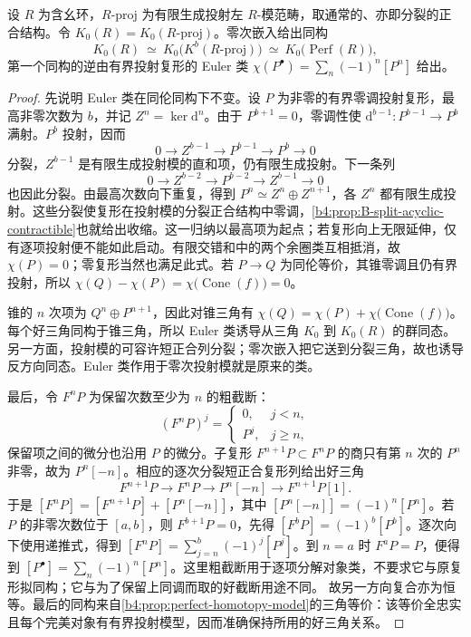 \begin{theorem}\label{b4:thm:B-euler-isomorphism}
	设 \(R\) 为含幺环，\(R\text{-}\mathrm{proj}\) 为有限生成投射左 \(R\)-模范畴，取通常的、亦即分裂的正合结构。令 \(K_0(R)=K_0(R\text{-}\mathrm{proj})\)。零次嵌入给出同构
	\[
		K_0(R)\ \simeq\ K_0\bigl(K^b(R\text{-}\mathrm{proj})\bigr) \ \simeq\ K_0\bigl(\operatorname{Perf}(R)\bigr),
	\]
	第一个同构的逆由有界投射复形的 Euler 类 \(\chi(P^\bullet)=\sum_n(-1)^n[P^n]\) 给出。
\end{theorem}
\begin{proof}
	先说明 Euler 类在同伦同构下不变。设 \(P\) 为非零的有界零调投射复形，最高非零次数为 \(b\)，并记 \(Z^n=\ker\mathrm{d}^n\)。由于 \(P^{b+1}=0\)，零调性使 \(\mathrm{d}^{b-1}:P^{b-1}\to P^b\) 满射。\(P^b\) 投射，因而
	\[
		0\longrightarrow Z^{b-1}\longrightarrow P^{b-1} \longrightarrow P^b\longrightarrow0
	\]
	分裂，\(Z^{b-1}\) 是有限生成投射模的直和项，仍有限生成投射。下一条列
	\[
		0\longrightarrow Z^{b-2}\longrightarrow P^{b-2} \longrightarrow Z^{b-1}\longrightarrow0
	\]
	也因此分裂。由最高次数向下重复，得到 \(P^n\simeq Z^n\oplus Z^{n+1}\)，各 \(Z^n\) 都有限生成投射。这些分裂使复形在投射模的分裂正合结构中零调，\cref{b4:prop:B-split-acyclic-contractible}也就给出收缩。这一归纳以最高项为起点；若复形向上无限延伸，仅有逐项投射便不能如此启动。有限交错和中的两个余圈类互相抵消，故 \(\chi(P)=0\)；零复形当然也满足此式。若 \(P\rightarrow Q\) 为同伦等价，其锥零调且仍有界投射，所以 \(\chi(Q)-\chi(P)=\chi\bigl(\operatorname{Cone}(f)\bigr)=0\)。

	锥的 \(n\) 次项为 \(Q^n\oplus P^{n+1}\)，因此对锥三角有 \(\chi(Q)=\chi(P)+\chi\bigl(\operatorname{Cone}(f)\bigr)\)。 每个好三角同构于锥三角，所以 Euler 类诱导从三角 \(K_0\) 到 \(K_0(R)\) 的群同态。另一方面，投射模的可容许短正合列分裂；零次嵌入把它送到分裂三角，故也诱导反方向同态。Euler 类作用于零次投射模就是原来的类。

	最后，令 \(F^nP\) 为保留次数至少为 \(n\) 的粗截断：
	\[
		(F^nP)^j=\begin{cases}0,&j<n,\\P^j,&j\ge n,\end{cases}
	\]
	保留项之间的微分也沿用 \(P\) 的微分。子复形 \(F^{n+1}P\subset F^nP\) 的商只有第 \(n\) 次的 \(P^n\) 非零，故为 \(P^n[-n]\)。相应的逐次分裂短正合复形列给出好三角
	\[
		F^{n+1}P\longrightarrow F^nP\longrightarrow P^n[-n] \longrightarrow F^{n+1}P[1].
	\]
	于是 \([F^nP]=[F^{n+1}P]+[P^n[-n]]\)，其中 \([P^n[-n]]=(-1)^n[P^n]\)。若 \(P\) 的非零次数位于 \([a,b]\)，则 \(F^{b+1}P=0\)，先得 \([F^bP]=(-1)^b[P^b]\)。逐次向下使用递推式，得到 \([F^nP]=\sum_{j=n}^b(-1)^j[P^j]\)。到 \(n=a\) 时 \(F^aP=P\)，便得到 \([P^\bullet]=\sum_n(-1)^n[P^n]\)。这里粗截断用于逐项分解对象类，不要求它与原复形拟同构；它与为了保留上同调而取的好截断用途不同。 故另一方向复合亦为恒等。最后的同构来自\cref{b4:prop:perfect-homotopy-model}的三角等价：该等价全忠实且每个完美对象有有界投射模型，因而准确保持所用的好三角关系。
\end{proof}

